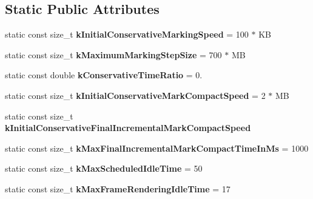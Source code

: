 \subsection*{Static Public Attributes}
\begin{DoxyCompactItemize}
\item 
static const size\+\_\+t {\bfseries k\+Initial\+Conservative\+Marking\+Speed} = 100 $\ast$ KB\hypertarget{classv8_1_1internal_1_1_g_c_idle_time_handler_a4cea45c6a3a359582e1e787691ec46e1}{}\label{classv8_1_1internal_1_1_g_c_idle_time_handler_a4cea45c6a3a359582e1e787691ec46e1}

\item 
static const size\+\_\+t {\bfseries k\+Maximum\+Marking\+Step\+Size} = 700 $\ast$ MB\hypertarget{classv8_1_1internal_1_1_g_c_idle_time_handler_ab4cccaad31be98d3d064a19bac735aca}{}\label{classv8_1_1internal_1_1_g_c_idle_time_handler_ab4cccaad31be98d3d064a19bac735aca}

\item 
static const double {\bfseries k\+Conservative\+Time\+Ratio} = 0.\hypertarget{classv8_1_1internal_1_1_g_c_idle_time_handler_a4242355d37d9b94c8c366d62d8f4a4da}{}\label{classv8_1_1internal_1_1_g_c_idle_time_handler_a4242355d37d9b94c8c366d62d8f4a4da}

\item 
static const size\+\_\+t {\bfseries k\+Initial\+Conservative\+Mark\+Compact\+Speed} = 2 $\ast$ MB\hypertarget{classv8_1_1internal_1_1_g_c_idle_time_handler_a55817441b828a13cfa425466e23e3aaa}{}\label{classv8_1_1internal_1_1_g_c_idle_time_handler_a55817441b828a13cfa425466e23e3aaa}

\item 
static const size\+\_\+t {\bfseries k\+Initial\+Conservative\+Final\+Incremental\+Mark\+Compact\+Speed}
\item 
static const size\+\_\+t {\bfseries k\+Max\+Final\+Incremental\+Mark\+Compact\+Time\+In\+Ms} = 1000\hypertarget{classv8_1_1internal_1_1_g_c_idle_time_handler_a652e7b5e49fe3251bc270db42a647a9d}{}\label{classv8_1_1internal_1_1_g_c_idle_time_handler_a652e7b5e49fe3251bc270db42a647a9d}

\item 
static const size\+\_\+t {\bfseries k\+Max\+Scheduled\+Idle\+Time} = 50\hypertarget{classv8_1_1internal_1_1_g_c_idle_time_handler_a49215ab3e57f3d33ae146d371c2afebd}{}\label{classv8_1_1internal_1_1_g_c_idle_time_handler_a49215ab3e57f3d33ae146d371c2afebd}

\item 
static const size\+\_\+t {\bfseries k\+Max\+Frame\+Rendering\+Idle\+Time} = 17\hypertarget{classv8_1_1internal_1_1_g_c_idle_time_handler_a74962b6fe809a1066c3638ed4c79cd89}{}\label{classv8_1_1internal_1_1_g_c_idle_time_handler_a74962b6fe809a1066c3638ed4c79cd89}


\end{DoxyCompactItemize}
